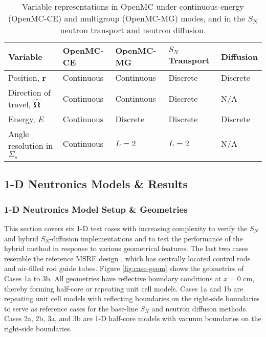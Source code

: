 \begin{table}[htb!]
  \centering
  \footnotesize
  \caption{Variable representations in OpenMC under continuous-energy (OpenMC-CE) and multigroup
  (OpenMC-MG) modes, and in the $S_N$ neutron transport and neutron diffusion.}
  \begin{tabular}{l l l l l}
    \toprule
    Variable & OpenMC-CE & OpenMC-MG & $S_N$ Transport & Diffusion \\
    \midrule
    Position, $\bm{r}$ & Continuous & Continuous & Discrete & Discrete \\
    Direction of travel, $\bm{\hat{\Omega}}$ & Continuous & Continuous & Discrete & N/A \\
    Energy, $E$ & Continuous & Discrete & Discrete & Discrete \\
    Angle resolution in $\Sigma_s$ & Continuous & $L=2$ & $L=2$ & N/A \\
    \bottomrule
  \end{tabular}
  \label{table:var}
\end{table}

\subsection{1-D Neutronics Models \& Results} \label{sec:1d-results}


\subsubsection{1-D Neutronics Model Setup \& Geometries} \label{sec:1d-model-setup}

This section covers six 1-D test cases with increasing complexity to verify the $S_N$ and hybrid
$S_N$-diffusion implementations and to test the performance of the hybrid
method in response to various geometrical features. The last two cases resemble the
reference \gls{MSRE} design \cite{robertson_msre_1965}, which has centrally located control rods
and air-filled rod guide tubes. Figure \ref{fig:case-geom} shows the geometries of Cases 1a to
3b. All geometries have reflective boundary conditions at $x=0$ cm, thereby
forming half-core or repeating unit cell models. Cases 1a and 1b are repeating unit
cell models with reflecting boundaries on the right-side boundaries to serve as reference cases for
the base-line $S_N$ and neutron diffuson methods. Cases 2a, 2b, 3a, and 3b
are 1-D half-core models with vacuum boundaries on the right-side boundaries.

